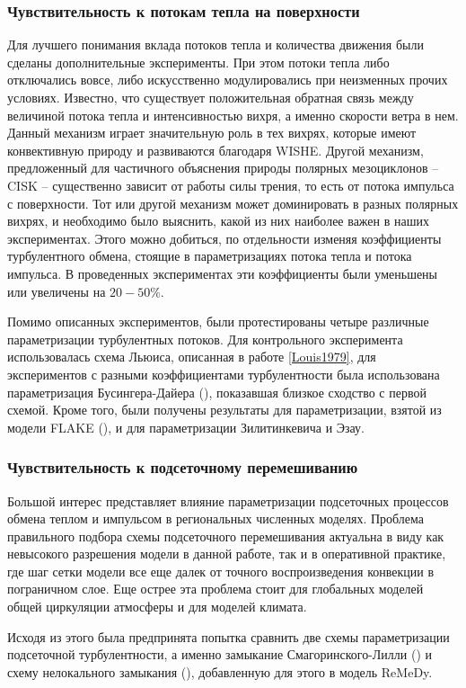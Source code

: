 \documentclass[12pt,a4paper]{report}
\begin{document}
\subsubsection{Чувствительность к потокам тепла на поверхности}
Для лучшего понимания вклада потоков тепла и количества движения были сделаны дополнительные эксперименты. При этом потоки тепла либо отключались вовсе, либо искусственно модулировались при неизменных прочих условиях. 
Известно, что существует положительная обратная связь между величиной потока тепла и интенсивностью вихря, а именно скорости ветра в нем. Данный механизм играет значительную роль в тех вихрях, которые имеют конвективную природу и развиваются благодаря WISHE. Другой механизм, предложенный  для частичного объяснения природы полярных мезоциклонов -- CISK -- существенно зависит от работы силы трения, то есть от потока импульса с поверхности. Тот или другой механизм может доминировать в разных полярных вихрях, и необходимо было выяснить, какой из них наиболее важен в наших экспериментах. Этого можно добиться, по отдельности изменяя коэффициенты турбулентного обмена, стоящие в параметризациях потока тепла и потока импульса. В проведенных экспериментах эти коэффициенты были уменьшены или увеличены на $20-50\%$.

Помимо описанных экспериментов, были протестированы четыре различные параметризации турбулентных потоков. Для контрольного эксперимента использовалась схема Льюиса, описанная в работе \ref{Louis1979}, для экспериментов с разными коэффициентами турбулентности была использована параметризация Бусингера-Дайера (\citep{MirandaPhD}), показавшая близкое сходство с первой схемой. Кроме того, были получены результаты для параметризации, взятой из модели FLAKE (\citep{Mironov2006}), и для параметризации Зилитинкевича и Эзау.

\subsubsection{Чувствительность к подсеточному перемешиванию}
Большой интерес представляет влияние параметризации подсеточных процессов обмена теплом и импульсом в региональных численных моделях. Проблема правильного подбора схемы подсеточного перемешивания актуальна в виду как невысокого разрешения модели в данной работе, так и в оперативной практике, где шаг сетки модели все еще далек от точного воспроизведения конвекции в пограничном слое. Еще острее эта проблема стоит для глобальных моделей общей циркуляции атмосферы и для моделей климата. 

Исходя из этого была предпринята попытка сравнить две схемы параметризации подсеточной турбулентности, а именно замыкание Смагоринского-Лилли (\citep{MirandaPhD}) и схему нелокального замыкания (\citep{LupkesSchluenzen1996,NohEtAl2003}), добавленную для этого в модель ReMeDy.




\end{document}
